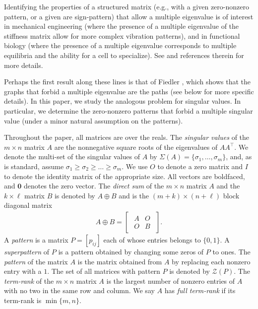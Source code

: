 \documentclass[preprint,12pt]{elsarticle}
\newcommand{\trans  }{^\top}
\newcommand{\Z}{\mathcal{Z}}
\begin{document}
Identifying the properties of a structured matrix (e.g., with a given zero-nonzero pattern, or a given are sign-pattern) that allow a multiple eigenvalue is of interest in mechanical engineering (where the presence of a multiple eigenvalue of the stiffness matrix 
allow for more complex vibration patterns), 
and in functional biology (where the presence of a multiple eigenvalue corresponds to multiple equilibria and the ability for a cell to specialize). See 
\cite{HLS} and references therein for more details.

Perhaps the first result along these lines is that of Fiedler \cite{F1964}, which shows that the graphs that forbid a multiple eigenvalue 
are the paths (see below for more specific details).  In this paper, we study the analogous problem for singular values. In particular, we determine the zero-nonzero patterns that forbid a multiple singular value (under a minor natural assumption
on the patterns). 

Throughout the paper,  all matrices are over the reals. The  \textit{singular values} of
the $m\times n$ matrix $A$ are the nonnegative square roots of the eigenvalues of $AA\trans$.
We denote the  multi-set of the singular values of $A$ by $\Sigma(A) = \{\sigma_1,\dots,\sigma_m\}$,
and, as is standard, assume $\sigma_1 \geq \sigma_2 \geq \dots \geq \sigma_m$. 
We  use $O$ to denote a zero matrix and $I$ to denote the identity matrix of the appropriate size. All vectors are  boldfaced, and  $\mathbf{0}$ denotes the zero vector. The \textit{direct sum} of 
the  $m\times n$ matrix $A$ and the  $k \times \ell$ matrix $B$ is denoted by  $A \oplus B$ and is the $(m + k) \times (n+ \ell)$ block diagonal matrix
\begin{align*}
    A \oplus B = \begin{bmatrix}
    \begin{array}{r|r}
        A & O\\ \hline 
        O & B
        \end{array}
    \end{bmatrix}.
\end{align*} 
A \textit{pattern} is a matrix $P=[p_{ij}]$ each of whose entries belongs to $\{0,1\}$.
A \textit{superpattern} of $P$ is 
a pattern obtained by changing some zeros of $P$  to ones. 
The \textit{pattern} of the matrix $A$ is the matrix obtained from $A$ by replacing 
each nonzero entry with a $1$.  The set of all matrices with  pattern $P$ is 
denoted by $\Z(P)$.
 The \textit{term-rank} of the $m\times n$ matrix $A$ is the largest number of 
nonzero entries of $A$ with no two in the same row and column. We say $A$ has \textit{full term-rank} if its term-rank is $\min\{m,n\}$. 
\end{document}
